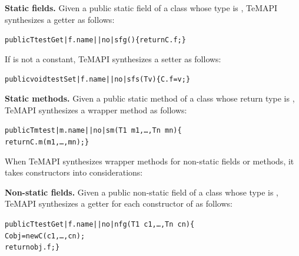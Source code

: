 \textbf{Static fields.} Given a public static field  of a class  whose type is , TeMAPI synthesizes a getter as follows:

\begin{CodeOut}\vspace*{-1.5ex}
\begin{alltt}
 public T testGet|f.name||no|sfg()\{ return C.f; \}
\end{alltt}
\end{CodeOut}\vspace*{-1.5ex}

If  is not a constant, TeMAPI synthesizes a setter as follows:

\begin{CodeOut}\vspace*{-1.5ex}
\begin{alltt}
 public void testSet|f.name||no|sfs(T v)\{ C.f = v; \}
\end{alltt}
\end{CodeOut}\vspace*{-1.5ex}

\textbf{Static methods.} Given a public static method  of a class  whose return type is , TeMAPI synthesizes a wrapper method as follows:

\begin{CodeOut}\vspace*{-1.5ex}
\begin{alltt}
 public Tm test|m.name||no|sm(T1\ m1,\ldots, Tn\ mn)\{
   return C.m(m1,\ldots, mn); \}
\end{alltt}
\end{CodeOut}\vspace*{-1.5ex}

When TeMAPI synthesizes wrapper methods for non-static fields or methods, it takes constructors into considerations:

\textbf{Non-static fields.} Given a public non-static field  of a class  whose type is , TeMAPI synthesizes a getter for each constructor  of  as follows:

\begin{CodeOut}\vspace*{-1.5ex}
\begin{alltt}
 public T testGet|f.name||no|nfg(T1\ c1,\ldots, Tn\ cn)\{
    C obj = new C(c1,\ldots, cn);
    return obj.f; \}
\end{alltt}
\end{CodeOut}\vspace*{-1.5ex}


